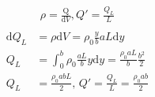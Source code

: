 \begin{align*}
    \rho = \frac{\mathrm Q}{\mathrm dV},
    Q' = \frac{Q_L}{L}\\
\end{align*}
\begin{align*}
    \mathrm dQ_L &= \rho\mathrm dV = \rho_0\frac{y}{b} aL\mathrm dy\\
    Q_L &= \int_0^b\rho_0\frac{aL}{b}y\mathrm dy = \frac{\rho_0 aL}{b}\frac{b^2}{2}\\
    Q_L &= \frac{\rho_0 a b L}{2},\,
    Q' = \frac{Q_L}{L} = \frac{\rho_0 ab}{2}
\end{align*}
